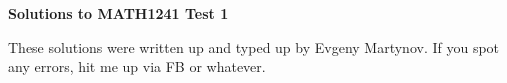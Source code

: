 \documentclass[11pt]{article}
\begin{document}
    \begin{center}
        {\Large\bf Solutions to MATH1241 Test 1}
    \end{center}

    These solutions were written up and typed up by Evgeny Martynov. If you spot any errors, hit me up via FB or whatever.
    \vspace{15mm}

    
    
    
\end{document}
